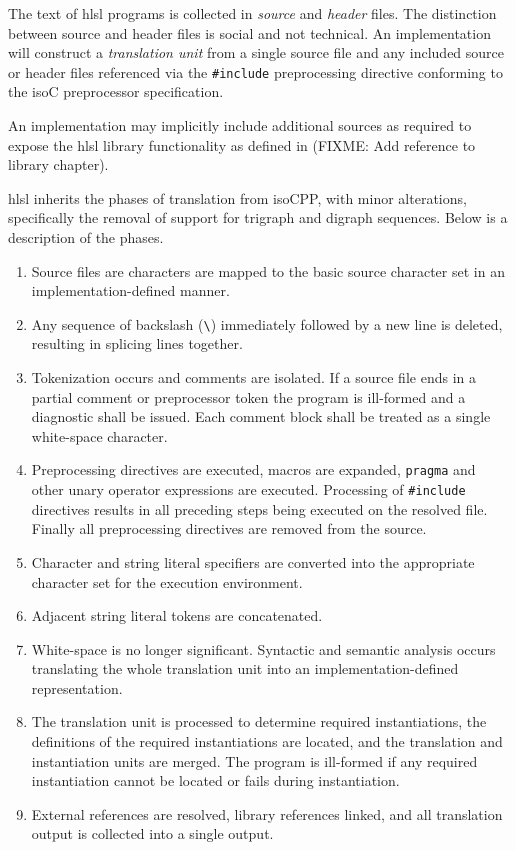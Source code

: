 

\p The text of \acrshort{hlsl} programs is collected in \textit{source} and
\textit{header} files. The distinction between source and header files is social
and not technical. An implementation will construct a \textit{translation unit}
from a single source file and any included source or header files referenced via
the \texttt{\#include} preprocessing directive conforming to the \gls{isoC}
preprocessor specification.

\p An implementation may implicitly include additional sources as required to
expose the \acrshort{hlsl} library functionality as defined in (FIXME: Add
reference to library chapter).


\p \acrshort{hlsl} inherits the phases of translation from \gls{isoCPP}, with
minor alterations, specifically the removal of support for trigraph and digraph
sequences. Below is a description of the phases.

\begin{enumerate}
  \item Source files are characters are mapped to the basic source character set
  in an implementation-defined manner.
  \item Any sequence of backslash (\texttt{\textbackslash}) immediately followed
  by a new line is deleted, resulting in splicing lines together.
  \item Tokenization occurs and comments are isolated. If a source file ends in
  a partial comment or preprocessor token the program is ill-formed and a
  diagnostic shall be issued. Each comment block shall be treated as a single
  white-space character.
  \item Preprocessing directives are executed, macros are expanded,
  \texttt{pragma} and other unary operator expressions are executed. Processing
  of \texttt{\#include} directives results in all preceding steps being executed
  on the resolved file. Finally all preprocessing directives are removed from
  the source.
  \item Character and string literal specifiers are converted into the
  appropriate character set for the execution environment.
  \item Adjacent string literal tokens are concatenated.
  \item White-space is no longer significant. Syntactic and semantic analysis
  occurs translating the whole translation unit into an implementation-defined
  representation.
  \item The translation unit is processed to determine required instantiations,
  the definitions of the required instantiations are located, and the
  translation and instantiation units are merged. The program is ill-formed if
  any required instantiation cannot be located or fails during instantiation.
  \item External references are resolved, library references linked, and all
  translation output is collected into a single output.
\end{enumerate}
